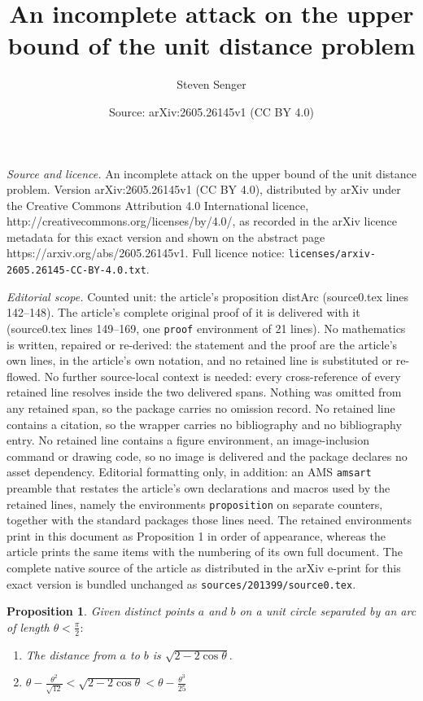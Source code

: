 \documentclass[10pt,a4paper]{amsart}
\title{An incomplete attack on the upper bound of the unit distance problem}
\author{Steven Senger}
\date{Source: arXiv:2605.26145v1 (CC BY 4.0)}
\newtheorem{proposition}{Proposition}
\begin{document}
\maketitle

\noindent\emph{Source and licence.} An incomplete attack on the upper bound of the unit distance problem. Version arXiv:2605.26145v1 (CC BY 4.0), distributed by arXiv under the Creative Commons Attribution 4.0 International licence, http://creativecommons.org/licenses/by/4.0/, as recorded in the arXiv licence metadata for this exact version and shown on the abstract page https://arxiv.org/abs/2605.26145v1. Full licence notice: \texttt{licenses/arxiv-2605.26145-CC-BY-4.0.txt}.\par\smallskip

\noindent\textit{Editorial scope.} Counted unit: the article's proposition distArc (source0.tex lines 142--148). The article's complete original proof of it is delivered with it (source0.tex lines 149--169, one \texttt{proof} environment of 21 lines). No mathematics is written, repaired or re-derived: the statement and the proof are the article's own lines, in the article's own notation, and no retained line is substituted or re-flowed.  No further source-local context is needed: every cross-reference of every retained line resolves inside the two delivered spans.  Nothing was omitted from any retained span, so the package carries no omission record.  No retained line contains a citation, so the wrapper carries no bibliography and no bibliography entry.  No retained line contains a figure environment, an image-inclusion command or drawing code, so no image is delivered and the package declares no asset dependency.  Editorial formatting only, in addition: an AMS \texttt{amsart} preamble that restates the article's own declarations and macros used by the retained lines, namely the environments \texttt{proposition} on separate counters, together with the standard packages those lines need.  The retained environments print in this document as Proposition 1 in order of appearance, whereas the article prints the same items with the numbering of its own full document.  The complete native source of the article as distributed in the arXiv e-print for this exact version is bundled unchanged as \texttt{sources/201399/source0.tex}.
\begin{proposition}\label{distArc}
Given distinct points $a$ and $b$ on a unit circle separated by an arc of length $\theta <\frac{\pi}{2}:$
\begin{enumerate}
\item[(i)] The distance from $a$ to $b$ is $\sqrt{2-2\cos\theta}.$
\item[(ii)] $\theta - \frac{\theta^2}{\sqrt{12}} < \sqrt{2-2\cos\theta} < \theta - \frac{\theta^3}{25}$
\end{enumerate}
\end{proposition}
\end{document}
